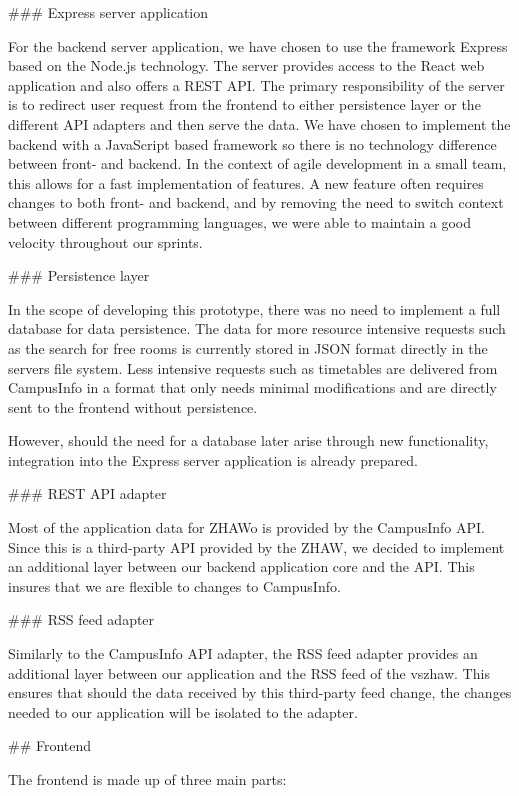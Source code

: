 \begin{markdown}
### Express server application

For the backend server application, we have chosen to use the framework Express \cite{Express} based on the Node.js \cite{Node} technology. The server provides access to the React web application and also offers a REST API. The primary responsibility of the server is to redirect user request from the frontend to either persistence layer or the different API adapters and then serve the data. We have chosen to implement the backend with a JavaScript based framework so there is no technology difference between front- and backend. In the context of agile development in a small team, this allows for a fast implementation of features. A new feature often requires changes to both front- and backend, and by removing the need to switch context between different programming languages, we were able to maintain a good velocity throughout our sprints.

### Persistence layer

In the scope of developing this prototype, there was no need to implement a full database for data persistence. The data for more resource intensive requests such as the search for free rooms is currently stored in JSON format directly in the servers file system. Less intensive requests such as timetables are delivered from CampusInfo in a format that only needs minimal modifications and are directly sent to the frontend without persistence.

However, should the need for a database later arise through new functionality, integration into the Express server application is already prepared.

### REST API adapter

Most of the application data for ZHAWo is provided by the CampusInfo API. Since this is a third-party API provided by the ZHAW, we decided to implement an additional layer between our backend application core and the API. This insures that we are flexible to changes to CampusInfo.

### RSS feed adapter

Similarly to the CampusInfo API adapter, the RSS feed adapter provides an additional layer between our application and the RSS feed of the vszhaw. This ensures that should the data received by this third-party feed change, the changes needed to our application will be isolated to the adapter.

\newpage

## Frontend

The frontend is made up of three main parts:


\end{markdown}
